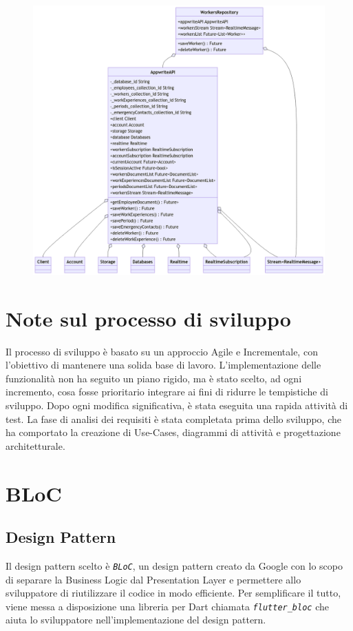 \documentclass[a4paper, oneside, 12pt]{article}
\begin{document}
\begin{figure}[H]
	\centering
	\includegraphics[width = 10 cm]{images/uml_2.png}
	\label{fig:attività dipendenti}
\end{figure}



\newpage
\section{Note sul processo di sviluppo}
Il processo di sviluppo è basato su un approccio Agile e Incrementale, con l'obiettivo di mantenere una solida base di lavoro. 
L'implementazione delle funzionalità non ha seguito un piano rigido, ma è stato scelto, ad ogni incremento, cosa fosse prioritario integrare
ai fini di ridurre le tempistiche di sviluppo. Dopo ogni modifica significativa, è stata eseguita una rapida attività di test. La fase di analisi 
dei requisiti è stata completata prima dello sviluppo, che ha comportato la creazione di Use-Cases, diagrammi di attività e progettazione architetturale.


\newpage
\section{BLoC}
\subsection{Design Pattern}
Il design pattern scelto è \textit{\texttt{BLoC}}, un design pattern creato da Google con lo scopo di separare la Business Logic dal Presentation Layer 
e permettere allo sviluppatore di riutilizzare il codice in modo efficiente. Per semplificare il tutto, viene messa a disposizione una libreria 
per Dart chiamata \textit{\texttt{flutter\_bloc}} che aiuta lo sviluppatore nell'implementazione del design pattern.
\end{document}
